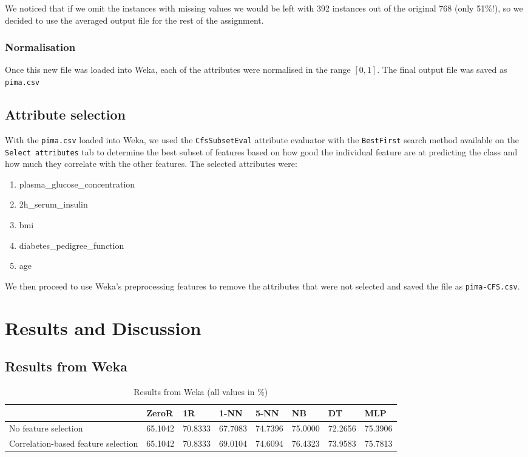 \documentclass{article}
\renewcommand{\tt}{\texttt}
\begin{document}
We noticed that if we omit the instances with missing values we would be left with 392 instances out of the original 768 (only 51\%!), so we decided to use the averaged output file for the rest of the assignment.

\subsubsection{Normalisation}
Once this new file was loaded into Weka, each of the attributes were normalised in the range $[0, 1]$. The final output file was saved as \tt{pima.csv}

\subsection{Attribute selection}
With the \tt{pima.csv} loaded into Weka, we used the \tt{CfsSubsetEval} attribute evaluator with the \tt{BestFirst} search method available on the \tt{Select attributes} tab to determine the best subset of features based on how good the individual feature are at predicting the class and how much they correlate with the other features.
The selected attributes were:
\begin{enumerate}[1.]
\item plasma\_glucose\_concentration
\item 2h\_serum\_insulin
\item bmi
\item diabetes\_pedigree\_function
\item age
\end{enumerate} 

We then proceed to use Weka's preprocessing features to remove the attributes that were not selected and saved the file as \tt{pima-CFS.csv}.

\section{Results and Discussion}

\subsection{Results from Weka}
\begin{table}[h]
\begin{tabular}{llllllll}
\hline
 									& ZeroR    & 1R         & 1-NN     & 5-NN     & NB         & DT        & MLP \\ \hline
No feature selection 					& 65.1042 & 70.8333 & 67.7083 & 74.7396 & 75.0000 & 72.2656 & 75.3906 \\
Correlation-based feature selection 	& 65.1042 & 70.8333 & 69.0104 & 74.6094 & 76.4323 & 73.9583 & 75.7813 \\ \hline
\end{tabular}
\caption{Results from Weka (all values in \%)}
\end{table}
\end{document}
